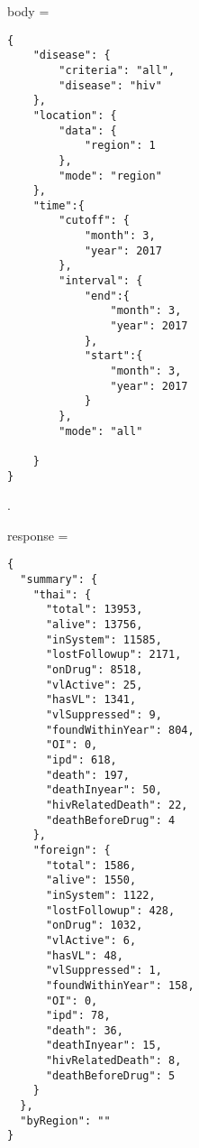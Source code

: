 \begin{multicols}{2}
body = 
\begin{verbatim}
{
	"disease": {
		"criteria": "all",
		"disease": "hiv"
	},
	"location": {
		"data": {
			"region": 1
		},
		"mode": "region"
	},
	"time":{
		"cutoff": {
			"month": 3,
			"year": 2017
		},
		"interval": {
			"end":{
				"month": 3,
				"year": 2017
			},
			"start":{
				"month": 3,
				"year": 2017
			}
		},
		"mode": "all"
		
	}
}
\end{verbatim}

.
\columnbreak

response =
\begin{verbatim}
{
  "summary": {
    "thai": {
      "total": 13953,
      "alive": 13756,
      "inSystem": 11585,
      "lostFollowup": 2171,
      "onDrug": 8518,
      "vlActive": 25,
      "hasVL": 1341,
      "vlSuppressed": 9,
      "foundWithinYear": 804,
      "OI": 0,
      "ipd": 618,
      "death": 197,
      "deathInyear": 50,
      "hivRelatedDeath": 22,
      "deathBeforeDrug": 4
    },
    "foreign": {
      "total": 1586,
      "alive": 1550,
      "inSystem": 1122,
      "lostFollowup": 428,
      "onDrug": 1032,
      "vlActive": 6,
      "hasVL": 48,
      "vlSuppressed": 1,
      "foundWithinYear": 158,
      "OI": 0,
      "ipd": 78,
      "death": 36,
      "deathInyear": 15,
      "hivRelatedDeath": 8,
      "deathBeforeDrug": 5
    }
  },
  "byRegion": ""
}
\end{verbatim}
\end{multicols}